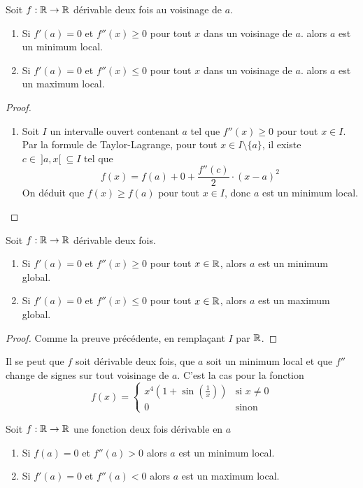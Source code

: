 \begin{proposition}
    Soit $f:\mathbb{R}\to\mathbb{R}$ dérivable deux fois au voisinage de $a$.
    \begin{enumerate}
        \item Si $f'(a)=0$ et $f''(x)\ge0$ pour tout $x$ dans un voisinage de $a$. alors $a$ est un minimum local.
         \item Si $f'(a)=0$ et $f''(x)\le 0$ pour tout $x$ dans un voisinage de $a$. alors $a$ est un maximum local. 
    \end{enumerate}
\end{proposition}
\begin{proof}
\begin{enumerate}
    \item Soit $I$ un intervalle ouvert contenant $a$ tel que $f''(x)\ge 0$ pour tout $x\in I$. Par la formule de Taylor-Lagrange, pour tout $x\in I\setminus\{a\}$, il existe $c\in \ ] a,x[\ \subseteq I$ tel que
    \begin{equation*}
        f(x)=f(a)+0+\frac{f''(c)}{2}\cdot(x-a)^2
    \end{equation*}
    On déduit que $f(x)\ge f(a)$ pour tout $x\in I$, donc $a$ est un minimum local.
\end{enumerate}    
\end{proof}
\begin{corollaire}
     Soit $f:\mathbb{R}\to\mathbb{R}$ dérivable deux fois.
    \begin{enumerate}
        \item Si $f'(a)=0$ et $f''(x)\ge 0$ pour tout $x\in\mathbb{R}$, alors $a$ est un minimum global.
        \item Si $f'(a)=0$ et $f''(x)\le 0$ pour tout $x\in\mathbb{R}$, alors $a$ est un maximum global. 
    \end{enumerate}
\end{corollaire}
\begin{proof}
    Comme la preuve précédente, en remplaçant $I$ par $\mathbb{R}$.
\end{proof}
\begin{exemple}
    Il se peut que $f$ soit dérivable deux fois, que $a$ soit un minimum local et que $f''$ change de signes sur tout voisinage de $a$. C'est la cas pour la fonction $$f(x) =\begin{cases}
        x^4(1+ \sin\left(\frac 1 x\right)) &\text{si } x\ne 0\\
        0 &\text{sinon}
    \end{cases} $$
\end{exemple}
\begin{proposition}
    Soit $f:\mathbb{R}\to \mathbb{R}$ une fonction deux fois dérivable en $a$
    \begin{enumerate}
        \item Si $f(a) = 0$ et $f''(a)>0$ alors $a$ est un minimum local.
        \item Si $f'(a) = 0$ et $f''(a)<0$ alors $a$ est un maximum local.
    \end{enumerate}
\end{proposition}
